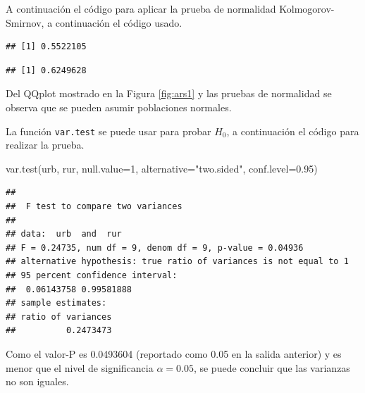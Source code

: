 \documentclass[
]{book}
\makeatletter
\newenvironment{Shaded}{\begin{snugshade}}{\end{snugshade}}
\newcommand{\AttributeTok}[1]{\textcolor[rgb]{0.77,0.63,0.00}{#1}}
\newcommand{\CommentTok}[1]{\textcolor[rgb]{0.56,0.35,0.01}{\textit{#1}}}
\newcommand{\DecValTok}[1]{\textcolor[rgb]{0.00,0.00,0.81}{#1}}
\newcommand{\FloatTok}[1]{\textcolor[rgb]{0.00,0.00,0.81}{#1}}
\newcommand{\FunctionTok}[1]{\textcolor[rgb]{0.00,0.00,0.00}{#1}}
\newcommand{\NormalTok}[1]{#1}
\newcommand{\SpecialCharTok}[1]{\textcolor[rgb]{0.00,0.00,0.00}{#1}}
\newcommand{\StringTok}[1]{\textcolor[rgb]{0.31,0.60,0.02}{#1}}
\newenvironment{kframe}{%
\medskip{}
\setlength{\fboxsep}{.8em}
 \def\at@end@of@kframe{}%
 \ifinner\ifhmode%
  \def\at@end@of@kframe{\end{minipage}}%
  \begin{minipage}{\columnwidth}%
 \fi\fi%
 \def\FrameCommand##1{\hskip\@totalleftmargin \hskip-\fboxsep
 \colorbox{shadecolor}{##1}\hskip-\fboxsep
     \hskip-\linewidth \hskip-\@totalleftmargin \hskip\columnwidth}%
 \MakeFramed {\advance\hsize-\width
   \@totalleftmargin\z@ \linewidth\hsize
   \@setminipage}}%
 {\par\unskip\endMakeFramed%
 \at@end@of@kframe}
\renewenvironment{Shaded}{\begin{kframe}}{\end{kframe}}
\makeatother
\begin{document}
A continuación el código para aplicar la prueba de normalidad Kolmogorov-Smirnov, a continuación el código usado.

\begin{Shaded}
\end{Shaded}

\begin{verbatim}
## [1] 0.5522105
\end{verbatim}

\begin{Shaded}
\end{Shaded}

\begin{verbatim}
## [1] 0.6249628
\end{verbatim}

Del QQplot mostrado en la Figura \ref{fig:ars1} y las pruebas de normalidad se observa que se pueden asumir poblaciones normales.

La función \texttt{var.test} se puede usar para probar \(H_0\), a continuación el código para realizar la prueba.

\begin{Shaded}
\begin{Highlighting}[]
\FunctionTok{var.test}\NormalTok{(urb, rur, }\AttributeTok{null.value=}\DecValTok{1}\NormalTok{, }\AttributeTok{alternative=}\StringTok{"two.sided"}\NormalTok{,}
         \AttributeTok{conf.level=}\FloatTok{0.95}\NormalTok{)}
\end{Highlighting}
\end{Shaded}

\begin{verbatim}
## 
##  F test to compare two variances
## 
## data:  urb  and  rur
## F = 0.24735, num df = 9, denom df = 9, p-value = 0.04936
## alternative hypothesis: true ratio of variances is not equal to 1
## 95 percent confidence interval:
##  0.06143758 0.99581888
## sample estimates:
## ratio of variances 
##          0.2473473
\end{verbatim}

Como el valor-P es 0.0493604 (reportado como 0.05 en la salida anterior) y es menor que el nivel de significancia \(\alpha=0.05\), se puede concluir que las varianzas no son iguales.
\end{document}
